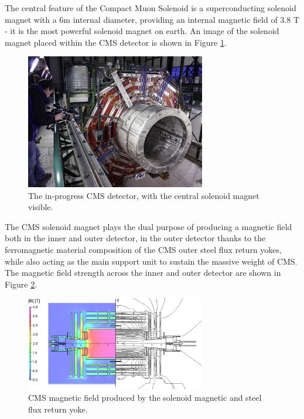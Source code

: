 The central feature of the Compact Muon Solenoid is a superconducting solenoid magnet with a 6m internal diameter, providing an internal magnetic field of 3.8 T - it is the most powerful solenoid magnet on earth. An image of the solenoid magnet placed within the CMS detector is shown in Figure \ref{fig:Magnet}.

\begin{figure}[H]
    \centering
    \includegraphics[width=0.7\textwidth]{Images/CMS/Magnet/CMS_Solenoid_Magnet.jpg}    
    \caption{The in-progress CMS detector, with the central solenoid magnet visible.}
    \label{fig:Magnet}
\end{figure}

The CMS solenoid magnet plays the dual purpose of producing a magnetic field both in the inner and outer detector, in the outer detector thanks to the ferromagnetic material composition of the CMS outer steel flux return yokes, while also acting as the main support unit to sustain the massive weight of CMS. The magnetic field strength across the inner and outer detector are shown in Figure \ref{fig:MagneticField}. 

\begin{figure}[H]
    \centering
    \includegraphics[width=0.7\textwidth]{Images/CMS/Magnet/CMS_Magnetic_Field.png}    
    \caption{CMS magnetic field produced by the solenoid magnetic and steel flux return yoke.}
    \label{fig:MagneticField}
\end{figure}

